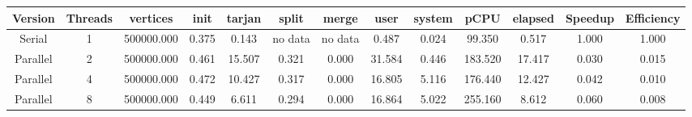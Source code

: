 \begin{tabular}{|c|c|c|c|c|c|c|c|c|c|c|c|c|}
\toprule
 Version &  Threads &   vertices &  init &  tarjan &   split &   merge &   user &  system &    pCPU &  elapsed &  Speedup &  Efficiency \\
\midrule
  Serial &        1 & 500000.000 & 0.375 &   0.143 & no data & no data &  0.487 &   0.024 &  99.350 &    0.517 &    1.000 &       1.000 \\
Parallel &        2 & 500000.000 & 0.461 &  15.507 &   0.321 &   0.000 & 31.584 &   0.446 & 183.520 &   17.417 &    0.030 &       0.015 \\
Parallel &        4 & 500000.000 & 0.472 &  10.427 &   0.317 &   0.000 & 16.805 &   5.116 & 176.440 &   12.427 &    0.042 &       0.010 \\
Parallel &        8 & 500000.000 & 0.449 &   6.611 &   0.294 &   0.000 & 16.864 &   5.022 & 255.160 &    8.612 &    0.060 &       0.008 \\
\bottomrule
\end{tabular}
